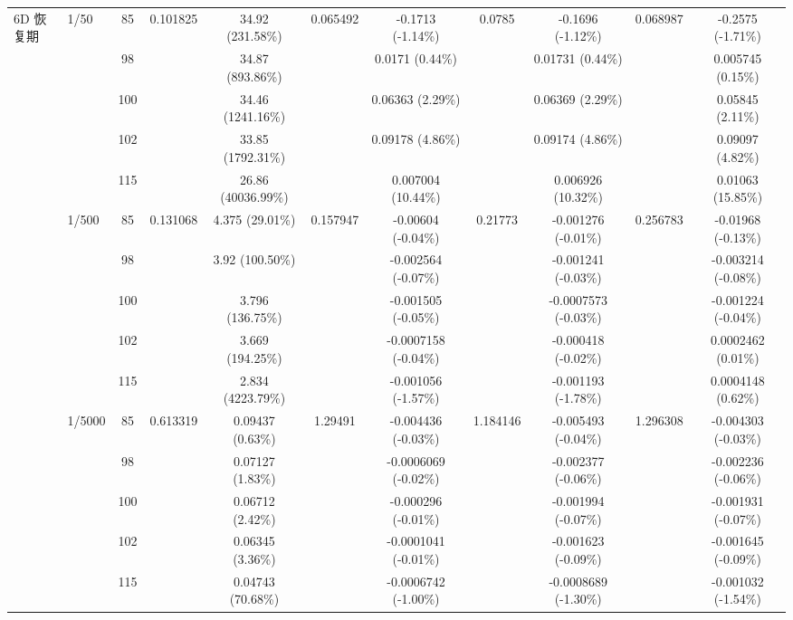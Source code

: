 \begin{table}[htbp]
{\begin{tabular}{llccccccccc}
\multirow{15}{*}{6D 恢复期}
& \multirow{5}{*}{1/50} & 85 & \multirow{5}{*}{0.101825} & 34.92 (231.58\%) & \multirow{5}{*}{0.065492} & -0.1713 (-1.14\%) & \multirow{5}{*}{0.0785} & -0.1696 (-1.12\%) & \multirow{5}{*}{0.068987} & -0.2575 (-1.71\%) \\
& & 98 & & 34.87 (893.86\%) & & 0.0171 (0.44\%) & & 0.01731 (0.44\%) & & 0.005745 (0.15\%) \\
& & 100 & & 34.46 (1241.16\%) & & 0.06363 (2.29\%) & & 0.06369 (2.29\%) & & 0.05845 (2.11\%) \\
& & 102 & & 33.85 (1792.31\%) & & 0.09178 (4.86\%) & & 0.09174 (4.86\%) & & 0.09097 (4.82\%) \\
& & 115 & & 26.86 (40036.99\%) & & 0.007004 (10.44\%) & & 0.006926 (10.32\%) & & 0.01063 (15.85\%) \\
\cmidrule(lr){2-11}
& \multirow{5}{*}{1/500} & 85 & \multirow{5}{*}{0.131068} & 4.375 (29.01\%) & \multirow{5}{*}{0.157947} & -0.00604 (-0.04\%) & \multirow{5}{*}{0.21773} & -0.001276 (-0.01\%) & \multirow{5}{*}{0.256783} & -0.01968 (-0.13\%) \\
& & 98 & & 3.92 (100.50\%) & & -0.002564 (-0.07\%) & & -0.001241 (-0.03\%) & & -0.003214 (-0.08\%) \\
& & 100 & & 3.796 (136.75\%) & & -0.001505 (-0.05\%) & & -0.0007573 (-0.03\%) & & -0.001224 (-0.04\%) \\
& & 102 & & 3.669 (194.25\%) & & -0.0007158 (-0.04\%) & & -0.000418 (-0.02\%) & & 0.0002462 (0.01\%) \\
& & 115 & & 2.834 (4223.79\%) & & -0.001056 (-1.57\%) & & -0.001193 (-1.78\%) & & 0.0004148 (0.62\%) \\
\cmidrule(lr){2-11}
& \multirow{5}{*}{1/5000} & 85 & \multirow{5}{*}{0.613319} & 0.09437 (0.63\%) & \multirow{5}{*}{1.29491} & -0.004436 (-0.03\%) & \multirow{5}{*}{1.184146} & -0.005493 (-0.04\%) & \multirow{5}{*}{1.296308} & -0.004303 (-0.03\%) \\
& & 98 & & 0.07127 (1.83\%) & & -0.0006069 (-0.02\%) & & -0.002377 (-0.06\%) & & -0.002236 (-0.06\%) \\
& & 100 & & 0.06712 (2.42\%) & & -0.000296 (-0.01\%) & & -0.001994 (-0.07\%) & & -0.001931 (-0.07\%) \\
& & 102 & & 0.06345 (3.36\%) & & -0.0001041 (-0.01\%) & & -0.001623 (-0.09\%) & & -0.001645 (-0.09\%) \\
& & 115 & & 0.04743 (70.68\%) & & -0.0006742 (-1.00\%) & & -0.0008689 (-1.30\%) & & -0.001032 (-1.54\%) \\
\bottomrule
  \end{tabular}%
  }
\end{table}

